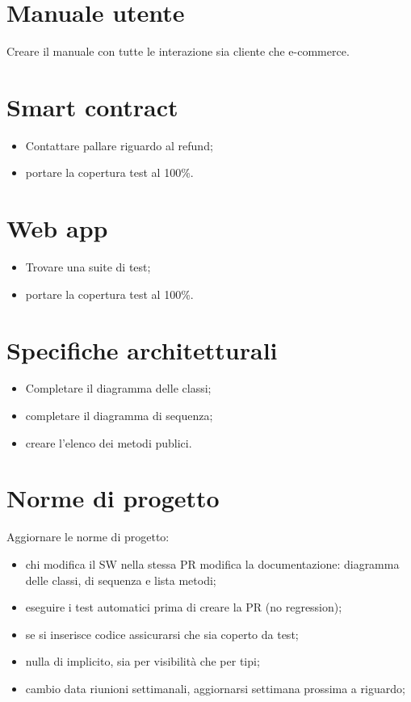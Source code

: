 \documentclass[a4paper, 12pt]{article}
\begin{document}
\section{Manuale utente}
Creare il manuale con tutte le interazione sia cliente che e-commerce.

\section{Smart contract}
\begin{itemize}
\item Contattare pallare riguardo al refund;
\item portare la copertura test al 100\%.
\end{itemize}

\section{Web app}
\begin{itemize}
	\item Trovare una suite di test;
	\item portare la copertura test al 100\%.
\end{itemize}	

\section{Specifiche architetturali}
\begin{itemize}
	\item Completare il diagramma delle classi;
	\item completare il diagramma di sequenza;
	\item creare l'elenco dei metodi publici.
\end{itemize}

\section{Norme di progetto}
Aggiornare le norme di progetto:
\begin{itemize}
	\item chi modifica il SW nella stessa PR modifica la documentazione: diagramma delle classi, di sequenza e lista metodi;
    \item eseguire i test automatici prima di creare la PR (no regression);
    \item se si inserisce codice assicurarsi che sia coperto da test;
    \item nulla di implicito, sia per visibilità che per tipi;
    \item cambio data riunioni settimanali, aggiornarsi settimana prossima a riguardo;
\end{itemize}
\end{document}
